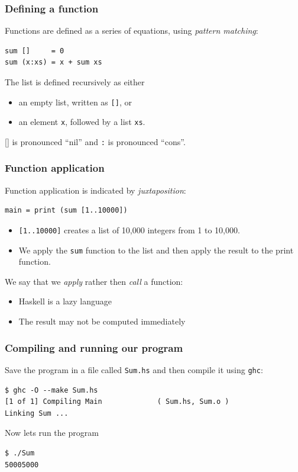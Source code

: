 \documentclass{beamer}
\begin{document}
\begin{frame}[fragile]
  \frametitle{Defining a function}

  Functions are defined as a series of equations, using
  \emph{pattern matching}:

  \begin{lstlisting}
sum []     = 0
sum (x:xs) = x + sum xs
  \end{lstlisting}

  The list is defined recursively as either
  \begin{itemize}
  \item an empty list, written as \lstinline![]!, or
  \item an element \lstinline!x!, followed by a list \lstinline!xs!.
  \end{itemize}
  [] is pronounced ``nil'' and \lstinline!:! is pronounced ``cons''.
\end{frame}

\begin{frame}[fragile]
  \frametitle{Function application}

  Function application is indicated by \emph{juxtaposition}:

\begin{lstlisting}
main = print (sum [1..10000])
\end{lstlisting}

  \begin{itemize}
  \item \lstinline![1..10000]! creates a list of 10,000 integers from
    1 to 10,000.
  \item We apply the \lstinline!sum! function to the list and then
    apply the result to the print function.
  \end{itemize}

  We say that we \emph{apply} rather then \emph{call} a function:
  \begin{itemize}
  \item Haskell is a lazy language
  \item The result may not be computed immediately
  \end{itemize}
\end{frame}

\begin{frame}[fragile]
  \frametitle{Compiling and running our program}

  Save the program in a file called \lstinline!Sum.hs! and then
  compile it using \lstinline!ghc!:

\begin{verbatim}
$ ghc -O --make Sum.hs
[1 of 1] Compiling Main             ( Sum.hs, Sum.o )
Linking Sum ...
\end{verbatim}

Now lets run the program

\begin{verbatim}
$ ./Sum
50005000
\end{verbatim}
\end{frame}
\end{document}
